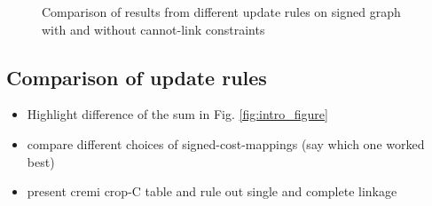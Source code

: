 \begin{figure}
    \caption{Comparison of results from different update rules on signed graph with and without cannot-link constraints }
    \label{fig:isbi-examples}
\end{figure}%


\subsection{Comparison of update rules} \label{sec:exp_first_comparison}
\begin{itemize}
  \item Highlight difference of the sum in Fig. \ref{fig:intro_figure}
  \item compare different choices of signed-cost-mappings (say which one worked best)
  \item present cremi crop-C table and rule out single and complete linkage
\end{itemize}




